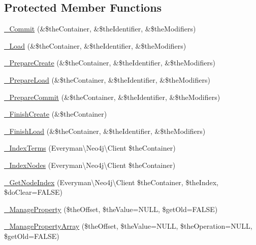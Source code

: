 \subsection*{Protected Member Functions}
\begin{DoxyCompactItemize}
\item 
\hyperlink{class_c_ontology_node_a590c869a08d167ba35d987e450106a2d}{\-\_\-\-Commit} (\&\$the\-Container, \&\$the\-Identifier, \&\$the\-Modifiers)
\item 
\hyperlink{class_c_ontology_node_a7a8304ab0e782d621012edddd8e7da3a}{\-\_\-\-Load} (\&\$the\-Container, \&\$the\-Identifier, \&\$the\-Modifiers)
\item 
\hyperlink{class_c_ontology_node_a8dd4c8bc984a535448618bbbba987a55}{\-\_\-\-Prepare\-Create} (\&\$the\-Container, \&\$the\-Identifier, \&\$the\-Modifiers)
\item 
\hyperlink{class_c_ontology_node_ac8a77d7437a9be4b4aa18626b1a9f95d}{\-\_\-\-Prepare\-Load} (\&\$the\-Container, \&\$the\-Identifier, \&\$the\-Modifiers)
\item 
\hyperlink{class_c_ontology_node_a460df05b73fd4160e7a652ed3b03dd78}{\-\_\-\-Prepare\-Commit} (\&\$the\-Container, \&\$the\-Identifier, \&\$the\-Modifiers)
\item 
\hyperlink{class_c_ontology_node_a3f116a2f1a1047da5187f21e20d3d405}{\-\_\-\-Finish\-Create} (\&\$the\-Container)
\item 
\hyperlink{class_c_ontology_node_a97c5e875641e3bb3da83d32ed8b26ebc}{\-\_\-\-Finish\-Load} (\&\$the\-Container, \&\$the\-Identifier, \&\$the\-Modifiers)
\item 
\hyperlink{class_c_ontology_node_a71d6391728200e6c77a4da829fdced6d}{\-\_\-\-Index\-Terms} (Everyman\textbackslash{}\-Neo4j\textbackslash{}\-Client \$the\-Container)
\item 
\hyperlink{class_c_ontology_node_ae5ca78d7d563ddd125aaffc13fb1d94b}{\-\_\-\-Index\-Nodes} (Everyman\textbackslash{}\-Neo4j\textbackslash{}\-Client \$the\-Container)
\item 
\hyperlink{class_c_ontology_node_ad55eaf2d688301aaa8ce9680640fb9ac}{\-\_\-\-Get\-Node\-Index} (Everyman\textbackslash{}\-Neo4j\textbackslash{}\-Client \$the\-Container, \$the\-Index, \$do\-Clear=F\-A\-L\-S\-E)
\item 
\hyperlink{class_c_ontology_node_ad8be3ea0ae6817b5d902b020885a1919}{\-\_\-\-Manage\-Property} (\$the\-Offset, \$the\-Value=N\-U\-L\-L, \$get\-Old=F\-A\-L\-S\-E)
\item 
\hyperlink{class_c_ontology_node_a0cd827cbc69208b7bdb7c670ed5c3544}{\-\_\-\-Manage\-Property\-Array} (\$the\-Offset, \$the\-Value=N\-U\-L\-L, \$the\-Operation=N\-U\-L\-L, \$get\-Old=F\-A\-L\-S\-E)
\end{DoxyCompactItemize}
